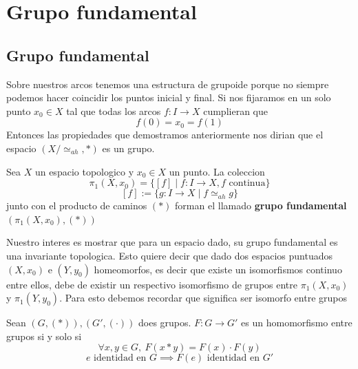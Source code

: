 \section{Grupo fundamental}




\subsection{Grupo fundamental}
Sobre nuestros arcos tenemos una estructura de grupoide porque no siempre
podemos hacer coincidir los puntos inicial y final. Si nos fijaramos en
un solo punto \(x_0 \in X\) tal que todas los arcos \(f : I \to X\)
cumplieran que
\[ f(0) = x_0 = f (1) \]
Entonces las propiedades que demostramos anteriormente nos dirian que el
espacio \((X / \simeq_{ah}, *)\) es un grupo.
\begin{definicion}
  Sea \(X\) un espacio topologico y \(x_0 \in X\) un punto. La coleccion
  \[ \pi_1 (X,x_0) = \{ [f] \mid f : I \to X, f \text{ continua}\}\]
  \[ [f] := \{ g : I \to X \mid f \simeq_{ah} g\}\]
  junto con el producto de caminos \((*)\) forman el llamado
  \textbf{grupo fundamental} \((\pi_1(X,x_0), (*))\)
\end{definicion}
Nuestro interes es mostrar que para un espacio dado, su grupo fundamental
es una invariante topologica. Esto quiere decir que dado dos espacios puntuados
\((X,x_0)\) e \((Y,y_0)\) homeomorfos, es decir que existe un isomorfismos continuo
entre ellos, debe de existir un respectivo isomorfismo de grupos entre
\(\pi_1(X,x_0)\) y \(\pi_1(Y,y_0)\). Para esto debemos recordar que
significa ser isomorfo entre grupos
\begin{definicion}
  Sean \((G,(*)), (G', (\cdot))\) does grupos. \(F : G \to G'\) es un
  homomorfismo entre grupos si y solo si
  \[ \forall x,y \in G,\ F (x * y) = F(x) \cdot F(y)\]
  \[ e \text{ identidad en } G \implies F(e) \text { identidad en } G' \]
\end{definicion}

